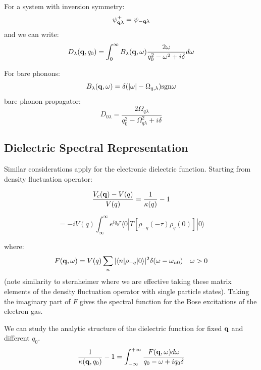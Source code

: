 \documentclass{article}
\def\q{{\bf q}}
\def\bra{\langle}
\def\ket{\rangle}
\begin{document}
For a system with inversion symmetry:
%
\begin{equation}
\psi_{\q\lambda}^{+} = \psi_{-\q\lambda}
\end{equation}
%
and we can write:
%
\begin{equation}
D_{\lambda}(\q,q_{0}) = \int_{0}^{\infty}B_{\lambda}(\q,\omega) \frac{2\omega}{q^{2}_{0}-\omega^{2}+i\delta}d\omega
\end{equation}
%

For bare phonons:
%
\begin{equation}
B_{\lambda}(\q,\omega) = \delta(|\omega| - \Omega_{q,\lambda}){\rm sgn} \omega
\end{equation}
%
bare phonon propagator:
%
\begin{equation}
D_{0\lambda} = \frac{2\Omega_{q\lambda}}{q_{0}^{2} - \Omega^{2}_{q\lambda}+i\delta}
\end{equation}

\subsection{Dielectric Spectral Representation}
Similar considerations apply for the electronic dielectric function.
Starting from density fluctuation operator:

\begin{equation}
\frac{V_{c}(\q) - V(q)}{V(q)} = \frac{1}{\kappa(q)}-1
\end{equation}

\begin{equation}
= -iV(q) \int_{\infty}^{\infty} e^{iq_{0}\tau} \bra 0|T[\rho_{-q}(-\tau)\rho_{q}(0)]|0\ket
\end{equation}
%

where:
%
\begin{equation}
F(\q,\omega) = V(q) \sum_{n} |\bra n|\rho_{-q}| 0\ket|^{2}\delta(\omega - \omega_{n0}) \quad \omega>0
\end{equation}
%
(note similarity to sternheimer where we are effective taking these matrix elements of the density fluctuation
operator with single particle states). Taking the imaginary part of $F$ gives the spectral function
for the Bose excitations of the electron gas.

We can study the analytic structure of the dielectric function for fixed $\q$ and different $q_{0}$.
%
\begin{equation}
\frac{1}{\kappa(\q,q_{0})} - 1 = \int_{-\infty}^{+\infty} \frac{F(\q,\omega) d\omega}{q_{0} - \omega + iq_{0}\delta}
\end{equation}
%
\end{document}

